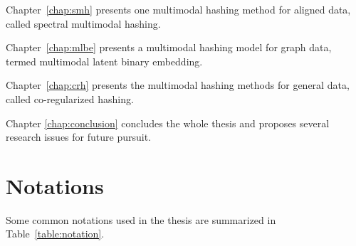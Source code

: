 Chapter~\ref{chap:smh} presents one multimodal hashing method for aligned data, called spectral multimodal hashing.

Chapter~\ref{chap:mlbe} presents a multimodal hashing model for graph data, termed multimodal latent binary embedding.

Chapter~\ref{chap:crh} presents the multimodal hashing methods for general data, called co-regularized hashing. %

Chapter \ref{chap:conclusion} concludes the whole thesis and proposes several research issues for future pursuit.

\section{Notations}
Some common notations used in the thesis are summarized in Table~\ref{table:notation}.

